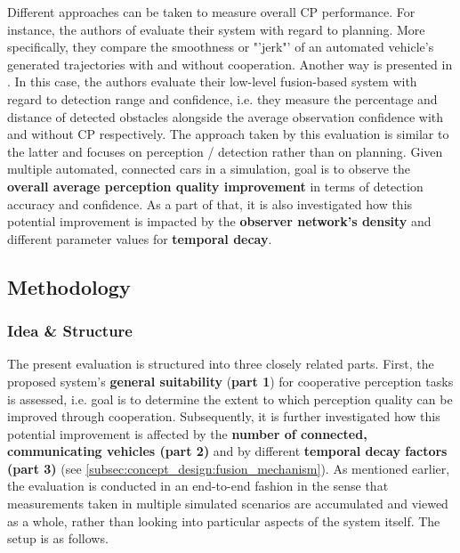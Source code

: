 Different approaches can be taken to measure overall CP performance. For instance, the authors of \cite{liu2013motion} evaluate their system with regard to planning. More specifically, they compare the smoothness or "'jerk"' of an automated vehicle's generated trajectories with and without cooperation. Another way is presented in \cite{Chen2019}. In this case, the authors evaluate their low-level fusion-based system with regard to detection range and confidence, i.e. they measure the percentage and distance of detected obstacles alongside the average observation confidence with and without CP respectively. The approach taken by this evaluation is similar to the latter and focuses on perception / detection rather than on planning. Given multiple automated, connected cars in a simulation, goal is to observe the \textbf{overall average perception quality improvement} in terms of detection accuracy and confidence. As a part of that, it is also investigated how this potential improvement is impacted by the \textbf{observer network's density} and different parameter values for \textbf{temporal decay}.

\subsection{Methodology}
\label{subsec:evaluation:perception_evaluation:methodology}

\subsubsection{Idea \& Structure}
The present evaluation is structured into three closely related parts. First, the proposed system's \textbf{general suitability} (\textbf{part 1}) for cooperative perception tasks is assessed, i.e. goal is to determine the extent to which perception quality can be improved through cooperation. Subsequently, it is further investigated how this potential improvement is affected by the \textbf{number of connected, communicating vehicles (part 2)} and by different \textbf{temporal decay factors (part 3)} (see \cref{subsec:concept_design:fusion_mechanism}). As mentioned earlier, the evaluation is conducted in an end-to-end fashion in the sense that measurements taken in multiple simulated scenarios are accumulated and viewed as a whole, rather than looking into particular aspects of the system itself. The setup is as follows.
\par
\bigskip

